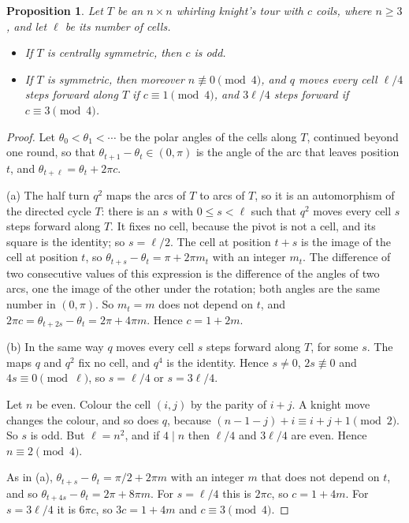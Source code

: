 \documentclass[11pt]{amsart}
\newtheorem{proposition}[theorem]{Proposition}
\theoremstyle{remark}
\begin{document}
\begin{proposition}\label{prop:symnec}
Let $T$ be an $n\times n$ whirling knight's tour with $c$ coils, where $n\ge3$, and let $\ell$ be its number of
cells.
\begin{itemize}
\item[(a)] If $T$ is centrally symmetric, then $c$ is odd.
\item[(b)] If $T$ is symmetric, then moreover $n\not\equiv0\pmod 4$, and $q$ moves every cell $\ell/4$ steps
forward along $T$ if $c\equiv1\pmod 4$, and $3\ell/4$ steps forward if $c\equiv3\pmod 4$.
\end{itemize}
\end{proposition}
\begin{proof}
Let $\theta_0<\theta_1<\cdots$ be the polar angles of the cells along $T$, continued beyond one round, so that
$\theta_{t+1}-\theta_t\in(0,\pi)$ is the angle of the arc that leaves position $t$, and
$\theta_{t+\ell}=\theta_t+2\pi c$.

(a) The half turn $q^2$ maps the arcs of $T$ to arcs of $T$, so it is an automorphism of the directed cycle $T$:
there is an $s$ with $0\le s<\ell$ such that $q^2$ moves every cell $s$ steps forward along $T$. It fixes no
cell, because the pivot is not a cell, and its square is the identity; so $s=\ell/2$. The cell at position $t+s$
is the image of the cell at position $t$, so $\theta_{t+s}-\theta_t=\pi+2\pi m_t$ with an integer $m_t$. The
difference of two consecutive values of this expression is the difference of the angles of two arcs, one the image
of the other under the rotation; both angles are the same number in $(0,\pi)$. So $m_t=m$ does not depend on $t$,
and $2\pi c=\theta_{t+2s}-\theta_t=2\pi+4\pi m$. Hence $c=1+2m$.

(b) In the same way $q$ moves every cell $s$ steps forward along $T$, for some $s$. The maps $q$ and $q^2$
fix no cell, and $q^4$ is the identity. Hence $s\ne0$, $2s\not\equiv0$ and $4s\equiv0\pmod\ell$, so $s=\ell/4$ or
$s=3\ell/4$.

Let $n$ be even. Colour the cell $(i,j)$ by the parity of $i+j$. A knight move changes the colour, and so does
$q$, because $(n-1-j)+i\equiv i+j+1\pmod 2$. So $s$ is odd. But $\ell=n^2$, and if $4\mid n$ then $\ell/4$ and
$3\ell/4$ are even. Hence $n\equiv2\pmod 4$.

As in (a), $\theta_{t+s}-\theta_t=\pi/2+2\pi m$ with an integer $m$ that does not depend on $t$, and so
$\theta_{t+4s}-\theta_t=2\pi+8\pi m$. For $s=\ell/4$ this is $2\pi c$, so $c=1+4m$. For $s=3\ell/4$ it is $6\pi c$,
so $3c=1+4m$ and $c\equiv3\pmod 4$.
\end{proof}
\end{document}
